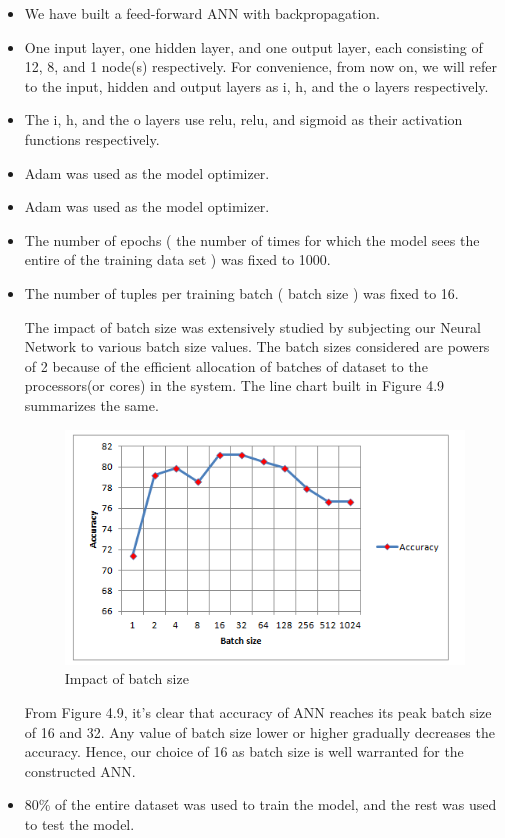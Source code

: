 \begin{itemize}
\item We have built a feed-forward ANN with backpropagation.
\item One input layer, one hidden layer, and one output layer, each consisting of 12, 8, and 1 node(s) respectively. For convenience, from now on, we will refer to the input, hidden and output layers as i, h, and the o layers respectively.
\item The i, h, and the o layers use relu, relu, and sigmoid as their activation functions respectively.
\item Adam was used as the model optimizer.
\item Adam was used as the model optimizer.
\item The number of epochs ( the number of times for which the model sees the entire of the training data set ) was fixed to 1000.
\item The number of tuples per training batch ( batch size ) was fixed to 16.
\par \noindent
The impact of batch size was extensively studied by subjecting our Neural Network to various batch size values. The batch sizes considered are powers of 2 because of the efficient allocation of batches of dataset to the processors(or cores) in the system. The line chart built in Figure 4.9 summarizes the same.
\begin{figure}[h]
\centering
\includegraphics[scale=1.0]{batch.PNG}
\caption{\label{fig:subBDDs1}Impact of batch size}
\end{figure}
\pagebreak
From Figure 4.9, it’s clear that accuracy of ANN reaches its peak batch size of 16 and 32. Any value of batch size lower or higher gradually decreases the accuracy. Hence, our choice of 16 as batch size is well warranted for the constructed ANN.
\item 80\% of the entire dataset was used to train the model, and the rest was used to test the model.
\end{itemize}

